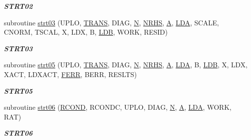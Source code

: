 \begin{DoxyCompactItemize}
\begin{DoxyCompactList}\small\item\em {\bfseries S\+T\+R\+T02} \end{DoxyCompactList}\item 
subroutine \hyperlink{group__single__lin_gab0745749dc1a0723d1279458f840c769}{strt03} (U\+P\+L\+O, \hyperlink{superlu__enum__consts_8h_a0c4e17b2d5cea33f9991ccc6a6678d62a1f61e3015bfe0f0c2c3fda4c5a0cdf58}{T\+R\+A\+N\+S}, D\+I\+A\+G, \hyperlink{polmisc_8c_a0240ac851181b84ac374872dc5434ee4}{N}, \hyperlink{example__user_8c_aa0138da002ce2a90360df2f521eb3198}{N\+R\+H\+S}, \hyperlink{classA}{A}, \hyperlink{example__user_8c_ae946da542ce0db94dced19b2ecefd1aa}{L\+D\+A}, S\+C\+A\+L\+E, C\+N\+O\+R\+M, T\+S\+C\+A\+L, X, L\+D\+X, B, \hyperlink{example__user_8c_a50e90a7104df172b5a89a06c47fcca04}{L\+D\+B}, W\+O\+R\+K, R\+E\+S\+I\+D)
\begin{DoxyCompactList}\small\item\em {\bfseries S\+T\+R\+T03} \end{DoxyCompactList}\item 
subroutine \hyperlink{group__single__lin_gac4324dced87037fe32c31bfd43db435b}{strt05} (U\+P\+L\+O, \hyperlink{superlu__enum__consts_8h_a0c4e17b2d5cea33f9991ccc6a6678d62a1f61e3015bfe0f0c2c3fda4c5a0cdf58}{T\+R\+A\+N\+S}, D\+I\+A\+G, \hyperlink{polmisc_8c_a0240ac851181b84ac374872dc5434ee4}{N}, \hyperlink{example__user_8c_aa0138da002ce2a90360df2f521eb3198}{N\+R\+H\+S}, \hyperlink{classA}{A}, \hyperlink{example__user_8c_ae946da542ce0db94dced19b2ecefd1aa}{L\+D\+A}, B, \hyperlink{example__user_8c_a50e90a7104df172b5a89a06c47fcca04}{L\+D\+B}, X, L\+D\+X, X\+A\+C\+T, L\+D\+X\+A\+C\+T, \hyperlink{superlu__enum__consts_8h_af00a42ecad444bbda75cde1b64bd7e72a78fd14d7abebae04095cfbe02928f153}{F\+E\+R\+R}, B\+E\+R\+R, R\+E\+S\+L\+T\+S)
\begin{DoxyCompactList}\small\item\em {\bfseries S\+T\+R\+T05} \end{DoxyCompactList}\item 
subroutine \hyperlink{group__single__lin_ga738cc77b80f4d244ecd99478215f789d}{strt06} (\hyperlink{superlu__enum__consts_8h_af00a42ecad444bbda75cde1b64bd7e72a9b5c151728d8512307565994c89919d5}{R\+C\+O\+N\+D}, R\+C\+O\+N\+D\+C, U\+P\+L\+O, D\+I\+A\+G, \hyperlink{polmisc_8c_a0240ac851181b84ac374872dc5434ee4}{N}, \hyperlink{classA}{A}, \hyperlink{example__user_8c_ae946da542ce0db94dced19b2ecefd1aa}{L\+D\+A}, W\+O\+R\+K, R\+A\+T)
\begin{DoxyCompactList}\small\item\em {\bfseries S\+T\+R\+T06} \end{DoxyCompactList}\item 

\end{DoxyCompactItemize}
